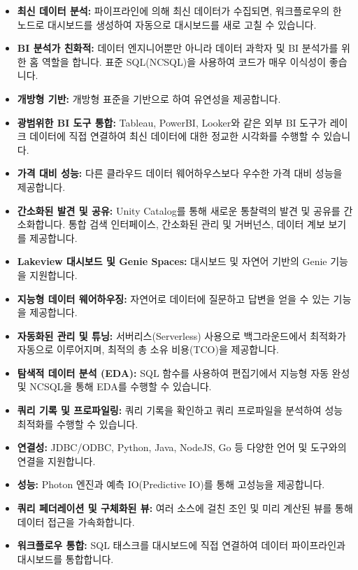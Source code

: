 \documentclass[11pt,a4paper]{article}
\begin{document}
\begin{itemize}
    \item \textbf{최신 데이터 분석:} 파이프라인에 의해 최신 데이터가 수집되면, 워크플로우의 한 노드로 대시보드를 생성하여 자동으로 대시보드를 새로 고칠 수 있습니다.
    \item \textbf{BI 분석가 친화적:} 데이터 엔지니어뿐만 아니라 데이터 과학자 및 BI 분석가를 위한 홈 역할을 합니다. 표준 SQL(NCSQL)을 사용하여 코드가 매우 이식성이 좋습니다.
    \item \textbf{개방형 기반:} 개방형 표준을 기반으로 하여 유연성을 제공합니다.
    \item \textbf{광범위한 BI 도구 통합:} Tableau, PowerBI, Looker와 같은 외부 BI 도구가 레이크 데이터에 직접 연결하여 최신 데이터에 대한 정교한 시각화를 수행할 수 있습니다.
    \item \textbf{가격 대비 성능:} 다른 클라우드 데이터 웨어하우스보다 우수한 가격 대비 성능을 제공합니다.
    \item \textbf{간소화된 발견 및 공유:} Unity Catalog를 통해 새로운 통찰력의 발견 및 공유를 간소화합니다. 통합 검색 인터페이스, 간소화된 관리 및 거버넌스, 데이터 계보 보기를 제공합니다.
    \item \textbf{Lakeview 대시보드 및 Genie Spaces:} 대시보드 및 자연어 기반의 Genie 기능을 지원합니다.
    \item \textbf{지능형 데이터 웨어하우징:} 자연어로 데이터에 질문하고 답변을 얻을 수 있는 기능을 제공합니다.
    \item \textbf{자동화된 관리 및 튜닝:} 서버리스(Serverless) 사용으로 백그라운드에서 최적화가 자동으로 이루어지며, 최적의 총 소유 비용(TCO)을 제공합니다.
    \item \textbf{탐색적 데이터 분석 (EDA):} SQL 함수를 사용하여 편집기에서 지능형 자동 완성 및 NCSQL을 통해 EDA를 수행할 수 있습니다.
    \item \textbf{쿼리 기록 및 프로파일링:} 쿼리 기록을 확인하고 쿼리 프로파일을 분석하여 성능 최적화를 수행할 수 있습니다.
    \item \textbf{연결성:} JDBC/ODBC, Python, Java, NodeJS, Go 등 다양한 언어 및 도구와의 연결을 지원합니다.
    \item \textbf{성능:} Photon 엔진과 예측 IO(Predictive IO)를 통해 고성능을 제공합니다.
    \item \textbf{쿼리 페더레이션 및 구체화된 뷰:} 여러 소스에 걸친 조인 및 미리 계산된 뷰를 통해 데이터 접근을 가속화합니다.
    \item \textbf{워크플로우 통합:} SQL 태스크를 대시보드에 직접 연결하여 데이터 파이프라인과 대시보드를 통합합니다.

\end{itemize}
\end{document}

